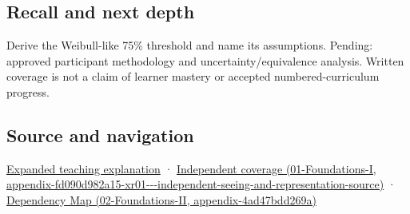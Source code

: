 \subsection{Recall and next depth}\label{appendix-1759f03e8ce7-recall-and-next-depth}

Derive the Weibull-like 75\% threshold and name its assumptions. Pending: approved participant methodology and uncertainty/equivalence analysis. Written coverage is not a claim of learner mastery or accepted numbered-curriculum progress.

\subsection{Source and navigation}\label{appendix-1759f03e8ce7-source-and-navigation}

\href{Continuous\%20Notes/University\%20-\%20Worlds,\%20Images\%20and\%20Inference\%20-\%20Graphics,\%20Vision\%20and\%20Photography\#A\%20threshold\%20is\%20evidence\%20from\%20a\%20procedure,\%20not\%20a\%20universal\%20border}{Expanded teaching explanation} · \href{../01-Foundations-I/main.pdf\#nameddest=appendix-fd090d982a15-xr01---independent-seeing-and-representation-source}{Independent coverage (01-Foundations-I, appendix-fd090d982a15-xr01-\/-\/-independent-seeing-and-representation-source)} · \href{../02-Foundations-II/main.pdf\#nameddest=appendix-4ad47bdd269a}{Dependency Map (02-Foundations-II, appendix-4ad47bdd269a)}
